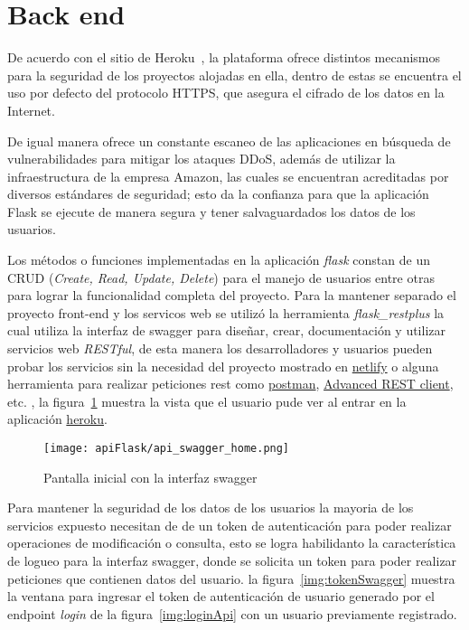 \section{Back end}


De acuerdo con el sitio de Heroku~\cite{heroku_heroku_2020}, la plataforma ofrece distintos mecanismos para la seguridad de los proyectos alojadas en ella, dentro de estas se encuentra el uso por defecto del protocolo HTTPS, que asegura el cifrado de los datos en la Internet.


De igual manera ofrece un constante escaneo de las aplicaciones en búsqueda de vulnerabilidades para mitigar los ataques DDoS, además de utilizar la infraestructura de la empresa Amazon, las cuales se encuentran acreditadas por diversos estándares de seguridad; esto da la confianza para que la aplicación Flask se ejecute de manera segura y tener salvaguardados los datos de los usuarios.


Los métodos o funciones implementadas en la aplicación \textit{flask} constan de un CRUD (\textit{Create, Read, Update, Delete}) para el manejo de usuarios entre otras para lograr la funcionalidad completa del proyecto. Para la mantener separado el proyecto front-end y los servicos web se utilizó  la herramienta \textit{flask\_restplus} la cual utiliza la interfaz de swagger para diseñar, crear, documentación y utilizar servicios web \textit{RESTful}, de esta manera los desarrolladores y usuarios pueden probar los servicios sin la necesidad del proyecto mostrado en \href{https://serene-haibt-2239b4.netlify.app}{netlify} o alguna herramienta para realizar peticiones rest como \href{https://www.postman.com/downloads/}{postman}, \href{https://install.advancedrestclient.com/install}{Advanced REST client}, etc. , la figura~\ref{img:swaggerApi} muestra la vista que el usuario pude ver al entrar en la aplicación \href{https://api-tt-2019-b052.herokuapp.com}{heroku}.

\begin{figure}[H]
  \centering
  \texttt{[image: apiFlask/api\_swagger\_home.png]}
  \caption{Pantalla inicial con la interfaz swagger}
  \label{img:swaggerApi}
\end{figure}


Para mantener la seguridad de los datos de los usuarios la mayoria de los servicios expuesto necesitan de de un token de autenticación para poder realizar operaciones de modificación o consulta, esto se logra habilidanto la característica de logueo para la interfaz swagger, donde se solicita un token para poder realizar peticiones que contienen datos del usuario. la figura~\ref{img:tokenSwagger} muestra la ventana para ingresar el token de autenticación de usuario generado por el endpoint \textit{login} de la figura~\ref{img:loginApi} con un usuario previamente registrado.

